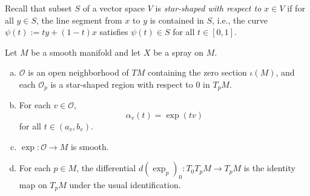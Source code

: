 Recall that subset $S$ of a vector space $V$ is \textit{star-shaped with respect to $x\in V$} if for all $y\in S$, the line segment from $x$ to $y$ is contained in $S$, i.e., the curve $\psi(t):=ty+(1-t)x$ satisfies $\psi(t)\in S$ for all $t\in[0,1]$.

\begin{prop}
    Let $M$ be a smooth manifold and let $X$ be a spray on $M$.  
    \begin{enumerate}[a.]
    	\item $\mathcal{O}$ is an open neighborhood of $TM$ containing the zero section $\iota(M)$, and each $\mathcal{O}_p$ is a star-shaped region with respect to $0$ in $T_pM$.
    	\item For each $v\in\mathcal{O}$,
    		$$\alpha_v(t)=\exp(tv)$$
    		for all $t\in(a_v,b_v)$.
    	\item $\exp:\mathcal{O}\to M$ is smooth.
    	\item For each $p\in M$, the differential $d(\exp_p)_0:T_0T_pM\to T_pM$ is the identity map on $T_pM$ under the usual identification.	
    \end{enumerate}
\end{prop}

